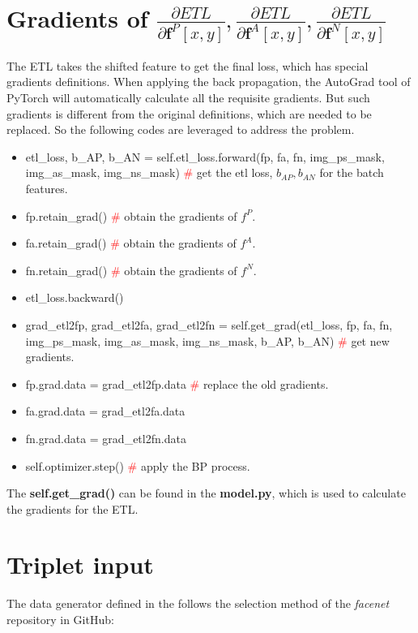 \documentclass{article}
\begin{document}
\section{Gradients of $\frac{\partial ETL}{\partial\mathbf{f}^{P}[x,y]},\frac{\partial ETL}{\partial\mathbf{f}^{A}[x,y]},\frac{\partial ETL}{\partial\mathbf{f}^{N}[x,y]}$}

The ETL takes the shifted feature to get the final loss, which has special gradients definitions. When applying the back propagation, the AutoGrad tool of PyTorch will automatically calculate all the requisite gradients. But such gradients is different from the original definitions, which are needed to be replaced. So the following codes are leveraged to address the problem.

\begin{itemize}
	\item etl\_loss, b\_AP, b\_AN = self.etl\_loss.forward(fp, fa, fn, img\_ps\_mask, img\_as\_mask, img\_ns\_mask)	\textcolor{red}{\#} get the etl loss, $b_{AP}, b_{AN}$ for the batch features.
	\item fp.retain\_grad() \textcolor{red}{\#} obtain the gradients of $f^{P}$.
	\item fa.retain\_grad() \textcolor{red}{\#} obtain the gradients of $f^{A}$.
	\item fn.retain\_grad() \textcolor{red}{\#} obtain the gradients of $f^{N}$.
	\item etl\_loss.backward()
	\item grad\_etl2fp, grad\_etl2fa, grad\_etl2fn = self.get\_grad(etl\_loss, fp, fa, fn, img\_ps\_mask, img\_as\_mask, img\_ns\_mask, b\_AP, b\_AN) \textcolor{red}{\#} get new gradients.
	\item fp.grad.data = grad\_etl2fp.data \textcolor{red}{\#} replace the old gradients.
	\item fa.grad.data = grad\_etl2fa.data
	\item fn.grad.data = grad\_etl2fn.data 
	\item self.optimizer.step() \textcolor{red}{\#} apply the BP process.
\end{itemize}

The \textbf{self.get\_grad()} can be found in the \textbf{model.py}, which is used to calculate the gradients for the ETL.

\section{Triplet input}
The data generator defined in the  follows the selection method of the \textit{facenet} repository in GitHub:
\end{document}
